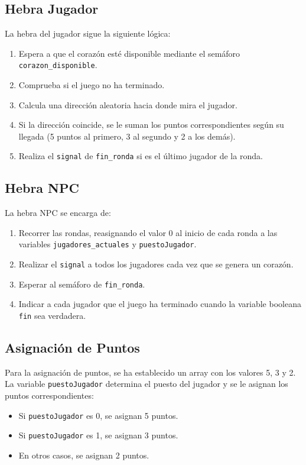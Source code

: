 \documentclass[a4paper,12pt]{article}
\begin{document}
\subsection{Hebra Jugador}
La hebra del jugador sigue la siguiente lógica:
\begin{enumerate}
    \item Espera a que el corazón esté disponible mediante el semáforo \texttt{corazon\_disponible}.
    \item Comprueba si el juego no ha terminado.
    \item Calcula una dirección aleatoria hacia donde mira el jugador.
    \item Si la dirección coincide, se le suman los puntos correspondientes según su llegada (5 puntos al primero, 3 al segundo y 2 a los demás).
    \item Realiza el \texttt{signal} de \texttt{fin\_ronda} si es el último jugador de la ronda.
\end{enumerate}

\subsection{Hebra NPC}
La hebra NPC se encarga de:
\begin{enumerate}
    \item Recorrer las rondas, reasignando el valor 0 al inicio de cada ronda a las variables \texttt{jugadores\_actuales} y \texttt{puestoJugador}.
    \item Realizar el \texttt{signal} a todos los jugadores cada vez que se genera un corazón.
    \item Esperar al semáforo de \texttt{fin\_ronda}.
    \item Indicar a cada jugador que el juego ha terminado cuando la variable booleana \texttt{fin} sea verdadera.
\end{enumerate}

\subsection{Asignación de Puntos}
Para la asignación de puntos, se ha establecido un array con los valores 5, 3 y 2. La variable \texttt{puestoJugador} determina el puesto del jugador y se le asignan los puntos correspondientes:
\begin{itemize}
    \item Si \texttt{puestoJugador} es 0, se asignan 5 puntos.
    \item Si \texttt{puestoJugador} es 1, se asignan 3 puntos.
    \item En otros casos, se asignan 2 puntos.
\end{itemize}
\end{document}
